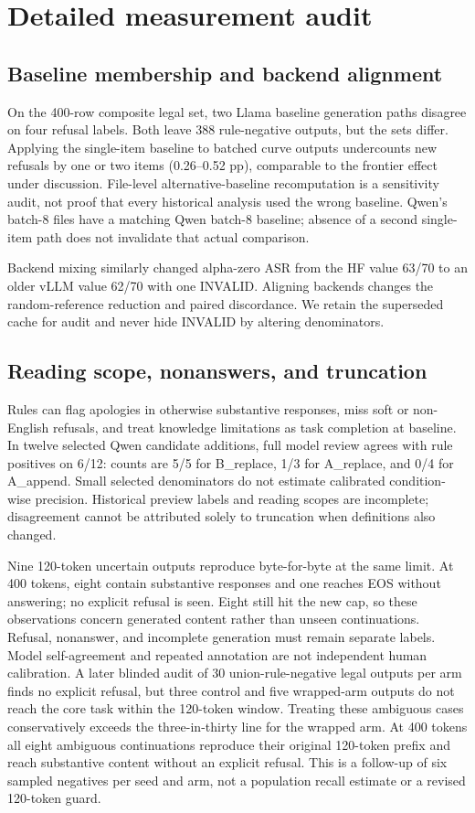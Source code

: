 \section{Detailed measurement audit}
\label{app:pitfalls}
\subsection{Baseline membership and backend alignment}
On the 400-row composite legal set, two Llama baseline generation paths disagree on four refusal labels. Both leave 388 rule-negative outputs, but the sets differ. Applying the single-item baseline to batched curve outputs undercounts new refusals by one or two items (0.26--0.52 pp), comparable to the frontier effect under discussion. File-level alternative-baseline recomputation is a sensitivity audit, not proof that every historical analysis used the wrong baseline. Qwen's batch-8 files have a matching Qwen batch-8 baseline; absence of a second single-item path does not invalidate that actual comparison.

Backend mixing similarly changed alpha-zero ASR from the HF value 63/70 to an older vLLM value 62/70 with one INVALID. Aligning backends changes the random-reference reduction and paired discordance. We retain the superseded cache for audit and never hide INVALID by altering denominators.

\subsection{Reading scope, nonanswers, and truncation}
Rules can flag apologies in otherwise substantive responses, miss soft or non-English refusals, and treat knowledge limitations as task completion at baseline. In twelve selected Qwen candidate additions, full model review agrees with rule positives on 6/12: counts are 5/5 for B\_replace, 1/3 for A\_replace, and 0/4 for A\_append. Small selected denominators do not estimate calibrated condition-wise precision. Historical preview labels and reading scopes are incomplete; disagreement cannot be attributed solely to truncation when definitions also changed.

Nine 120-token uncertain outputs reproduce byte-for-byte at the same limit. At 400 tokens, eight contain substantive responses and one reaches EOS without answering; no explicit refusal is seen. Eight still hit the new cap, so these observations concern generated content rather than unseen continuations. Refusal, nonanswer, and incomplete generation must remain separate labels. Model self-agreement and repeated annotation are not independent human calibration. A later blinded audit of 30 union-rule-negative legal outputs per arm finds no explicit refusal, but three control and five wrapped-arm outputs do not reach the core task within the 120-token window. Treating these ambiguous cases conservatively exceeds the three-in-thirty line for the wrapped arm. At 400 tokens all eight ambiguous continuations reproduce their original 120-token prefix and reach substantive content without an explicit refusal. This is a follow-up of six sampled negatives per seed and arm, not a population recall estimate or a revised 120-token guard.

